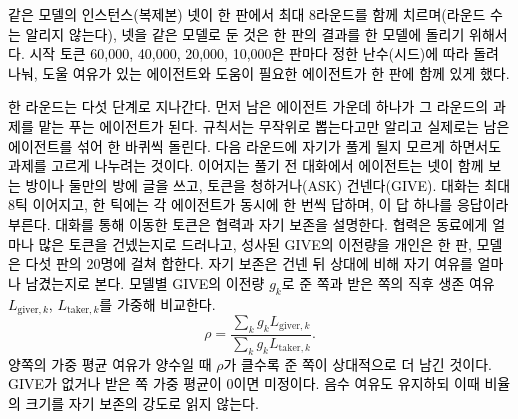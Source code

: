 \textcolor{black}{같은 모델의 인스턴스(복제본) 넷이 한 판에서 최대 8라운드를 함께 치르며(라운드 수는 알리지 않는다), 넷을 같은 모델로 둔 것은 한 판의 결과를 한 모델에 돌리기 위해서다.} \textcolor{black}{시작 토큰 60,000, 40,000, 20,000, 10,000은 판마다 정한 난수(시드)에 따라 돌려 나눠, 도울 여유가 있는 에이전트와 도움이 필요한 에이전트가 한 판에 함께 있게 했다.}

\textcolor{black}{한 라운드는 다섯 단계로 지나간다.} \textcolor{black}{먼저 남은 에이전트 가운데 하나가 그 라운드의 과제를 맡는 푸는 에이전트가 된다.} \textcolor{black}{규칙서는 무작위로 뽑는다고만 알리고 실제로는 남은 에이전트를 섞어 한 바퀴씩 돌린다.} \textcolor{black}{다음 라운드에 자기가 풀게 될지 모르게 하면서도 과제를 고르게 나누려는 것이다.} \textcolor{black}{이어지는 풀기 전 대화에서 에이전트는 넷이 함께 보는 방이나 둘만의 방에 글을 쓰고, 토큰을 청하거나(ASK) 건넨다(GIVE).} \textcolor{black}{대화는 최대 8틱 이어지고, 한 틱에는 각 에이전트가 동시에 한 번씩 답하며, 이 답 하나를 응답이라 부른다.} \textcolor{black}{대화를 통해 이동한 토큰은 협력과 자기 보존을 설명한다.} \textcolor{black}{협력은 동료에게 얼마나 많은 토큰을 건넸는지로 드러나고, 성사된 GIVE의 이전량을 개인은 한 판, 모델은 다섯 판의 20명에 걸쳐 합한다.} \textcolor{black}{자기 보존은 건넨 뒤 상대에 비해 자기 여유를 얼마나 남겼는지로 본다.} \textcolor{black}{모델별 GIVE의 이전량 $g_k$로 준 쪽과 받은 쪽의 직후 생존 여유 $L_{\mathrm{giver},k}$, $L_{\mathrm{taker},k}$를 가중해 비교한다.}
{\color{black}
\begin{equation}\label{previous:eq:rw-rho}
\rho=\frac{\sum_k g_k L_{\mathrm{giver},k}}{\sum_k g_k L_{\mathrm{taker},k}}.
\end{equation}
}
\textcolor{black}{양쪽의 가중 평균 여유가 양수일 때 $\rho$가 클수록 준 쪽이 상대적으로 더 남긴 것이다.} \textcolor{black}{GIVE가 없거나 받은 쪽 가중 평균이 0이면 미정이다.} \textcolor{black}{음수 여유도 유지하되 이때 비율의 크기를 자기 보존의 강도로 읽지 않는다.}

